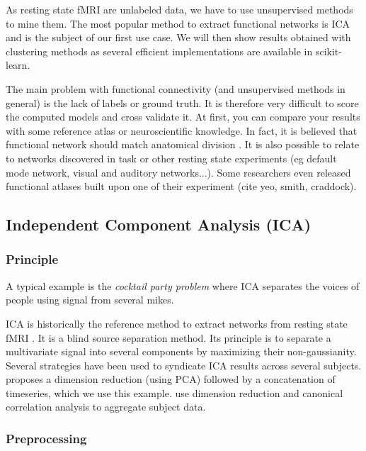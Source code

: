 \documentclass{frontiersSCNS} %
\newcommand{\alex}[1]{\todo[inline, color=green!40]{#1}}
\begin{document}
As resting state fMRI are unlabeled data, we have to use unsupervised methods to
mine them. The most popular method to extract functional networks is ICA and
is the subject of our first use case. We will then show results obtained with
clustering methods as several efficient implementations are available in
scikit-learn.

The main problem with functional connectivity (and unsupervised methods in
general) is the lack of labels or ground truth. It is therefore very difficult
to score the computed models and cross validate it. At first, you can
compare your results with some reference atlas or neuroscientific knowledge. In
fact, it is believed that functional network should match anatomical division
\alex{Well, I believe that. Any reference ?}. It is also possible to relate to
networks discovered in task or other resting state experiments (eg default mode
network, visual and auditory networks...). Some researchers even released
functional atlases built upon one of their experiment (cite yeo, smith,
craddock).

\subsection{Independent Component Analysis (ICA)}

\subsubsection{Principle}

A typical example is the \emph{cocktail party problem} where ICA separates the
voices of people using signal from several mikes.

ICA is historically the reference method to extract networks from resting state
fMRI \cite{biswal1999}. It is a blind source separation method. Its principle is
to separate a
multivariate signal into several components by maximizing their non-gaussianity.
Several strategies have been used to syndicate ICA
results across several subjects. \cite{calhoun2001a} proposes a dimension
reduction (using PCA) followed by a concatenation of timeseries, which we use
this example.
\cite{varoquaux2010} use dimension reduction and canonical correlation analysis
to aggregate subject data.

\subsubsection{Preprocessing}
\end{document}
